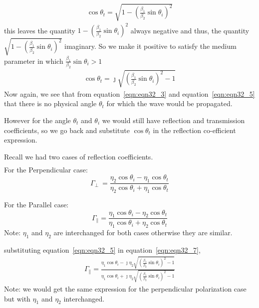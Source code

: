 \begin{align*}
\cos\theta_t = \sqrt{1-(\frac{\beta_1}{\beta_2}\sin\theta_i)^2}
\end{align*}
this leaves the quantity $1 - (\frac{\beta_1}{\beta_2}\sin\theta_i)^2$ always negative and thus, the quantity $\sqrt{1 - (\frac{\beta_1}{\beta_2}\sin\theta_i)^2}$ imaginary. So we make it positive to satisfy the medium parameter in which $\frac{\beta_1}{\beta_2}\sin\theta_i > 1$
\begin{align}
\cos\theta_t = \jmath\sqrt{(\frac{\beta_1}{\beta_2}\sin\theta_i)^2-1}
\label{eqn:eqn32_5}
\end{align}
Now again, we see that from equation~\ref{eqn:eqn32_3} and equation~\ref{eqn:eqn32_5} 
that there is no physical angle $\theta_t$ for which the wave would be propagated.

However for the angle $\theta_t$ and $\theta_i$ we would still have reflection and transmission coefficients, so we go back and substitute $\cos\theta_t$ in the reflection co-efficient expression.

Recall we had two cases of reflection coefficients.
\begin{align*}
\end{align*}For the Perpendicular case:
\begin{equation}
\Gamma_\perp\ = \frac{\eta_2\cos\theta_i - \eta_1\cos\theta_t}{\eta_2\cos\theta_i + \eta_1\cos\theta_t}
\label{eqn:eqn32_6}
\end{equation}

For the Parallel case:
\begin{equation}
\Gamma_\parallel = \frac{\eta_1\cos\theta_i - \eta_2\cos\theta_t}{\eta_1\cos\theta_i + \eta_2\cos\theta_t}
\label{eqn:eqn32_7}
\end{equation}
Note: $\eta_1$ and $\eta_2$ are interchanged for both cases otherwise they are similar. 

substituting equation~\ref{eqn:eqn32_5} in equation~\ref{eqn:eqn32_7},
\begin{align}
\Gamma_\parallel = \frac{\eta_1\cos\theta_i - \jmath\eta_2\sqrt{(\frac{\beta_1}{\beta_2}\sin\theta_i)^2-1}}{\eta_1\cos\theta_i + \jmath\eta_2\sqrt{(\frac{\beta_1}{\beta_2}\sin\theta_i)^2-1}}
\label{eqn:eqn32_8}
\end{align}
Note: we would get the same expression for the perpendicular polarization case but with $\eta_1$ and $\eta_2$ interchanged. 

